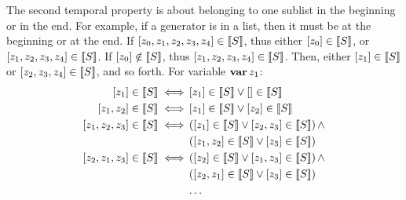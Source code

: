 \documentclass[12pt,openright,twoside,a4paper,oldfontcommands,english,brazil,final]{abntex2}
\newtheorem{definition}{Definition}[chapter]
\theoremstyle{theo}
\newcommand{\distinctlist}{%
  distinct list\footnote{Although some may use the terminology ``disjoint list'' to call a list of non-repeated elements, we use the same terminology (distinct list) of the theories built-in the \isabellehol tool.}%
  \global\renewcommand{\distinctlist}{distinct list}%
  \global\renewcommand{\distinctlists}{distinct lists}%
}
\newcommand{\distinctlists}{%
  distinct lists\footnote{Although some may use the terminology ``disjoint lists'' to call the lists of non-repeated elements, we use the same terminology (distinct lists) of the theories built-in the \isabellehol tool.}%
  \global\renewcommand{\distinctlist}{distinct list\xspace}%
  \global\renewcommand{\distinctlists}{distinct lists\xspace}%
  \xspace%
}
\newcommand{\isabellehol}[1][]{%
  Isabelle/HOL{#1}\index{Isabelle/HOL}~2015\footnote{The 2002 tutorial is reported in~\cite{NPW2002}, but there is a newer version published with the tool itself.
  The tool and the tutorial are available on their website at \url{http://isabelle.in.tum.de}.}%
  \global\renewcommand{\isabellehol}[1][]{Isabelle/HOL{#1}\index{Isabelle/HOL}\xspace}\xspace %
}
\def\varop{\ensuremath\operatorname{\mathbf{var}}}
\newcommand{\var}[1]{\ensuremath\varop #1}
\def\Tempotext{Tempo\xspace}
\newcommand{\listsin}[1]{\ensuremath\left[ #1 \right]}
\newcommand{\denote}[1]{\ensuremath\left[\!\left[#1\right]\!\right]}
\begin{document}
The second temporal property is about belonging to one sublist in the beginning or in the end.
For example, if a generator is in a list, then it must be at the beginning or at the end.
If $\listsin{z_0,z_1,z_2,z_3,z_4} \in \denote{S}$, thus either $\listsin{z_0}\in\denote{S}$, or $\listsin{z_1,z_2,z_3,z_4} \in \denote{S}$.
If $\listsin{z_0} \notin \denote{S}$, thus $\listsin{z_1,z_2,z_3,z_4} \in \denote{S}$.
Then, either $\listsin{z_1} \in \denote{S}$ or $\listsin{z_2,z_3,z_4} \in \denote{S}$, and so forth.
For variable $\var{z_1}$:
%
\begin{align}
\listsin{z_1} \in \denote{S} \iff &
  \listsin{z_1} \in \denote{S} \lor \listsin{} \in \denote{S}\nonumber\\
\listsin{z_1,z_2} \in \denote{S} \iff &
  \listsin{z_1} \in \denote{S} \lor \listsin{z_2} \in \denote{S}\nonumber\\
\listsin{z_1,z_2,z_3} \in \denote{S} \iff &
  \left(\listsin{z_1} \in \denote{S} \lor \listsin{z_2,z_3} \in \denote{S}\right) \land\nonumber\\
  &\left(\listsin{z_1,z_2} \in \denote{S} \lor \listsin{z_3} \in \denote{S}\right)
  \nonumber\\
\listsin{z_2,z_1,z_3} \in \denote{S} \iff &
  \left(\listsin{z_2} \in \denote{S} \lor \listsin{z_1,z_3} \in \denote{S}\right) \land\nonumber\\
  &\left(\listsin{z_2,z_1} \in \denote{S} \lor \listsin{z_3} \in \denote{S}\right)
  \nonumber\\
& \ldots\nonumber
\end{align}

%
%
\end{document}

